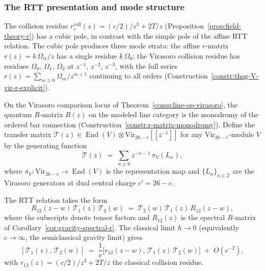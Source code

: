 \subsubsection{The RTT presentation and mode structure}
\label{subsubsec:virasoro-rtt}

The collision residue $r^{\mathrm{coll}}_c(z) = (c/2)/z^3 + 2T/z$
(Proposition~\ref{prop:field-theory-r}) has a cubic pole, in
contrast with the simple pole of the affine RTT relation. The cubic
pole produces three mode strata: the affine $r$-matrix
$r(z) = k\,\Omega_{\mathrm{tr}}/z$ has a single residue $k\,\Omega_0$; the
Virasoro collision residue has residues $\Omega_0$, $\Omega_1$,
$\Omega_2$ at $z^{-1}$, $z^{-2}$, $z^{-3}$, with the full series
$r(z) = \sum_{m \ge 0} \Omega_m/z^{m+1}$ continuing to all orders
(Construction~\ref{constr:thqg-V-vir-r-explicit}).

\begin{construction}
\label{constr:virasoro-rtt-relation}
On the Virasoro comparison locus of
Theorem~\ref{comp:line-op-virasoro}, the quantum $R$-matrix
$R(z)$ on the modeled line category is the
monodromy of the ordered bar connection
(Construction~\ref{constr:r-matrix-monodromy}).
Define the transfer matrix
$\mathcal{T}(z) \in
\operatorname{End}(V) \otimes
\mathrm{Vir}_{26-c}[\![z^{-1}]\!]$
for any $\mathrm{Vir}_{26-c}$-module $V$ by the generating function
\begin{equation}\label{eq:virasoro-transfer}
\mathcal{T}(z)
\;=\;
\sum_{n \ge 0}
z^{-n-1}\,
\pi_V(L_n),
\end{equation}
where $\pi_V \colon \mathrm{Vir}_{26-c} \to \operatorname{End}(V)$
is the representation map and $\{L_n\}_{n \in \mathbb{Z}}$ are the
Virasoro generators at dual central charge $c' = 26 - c$.

The RTT relation takes the form
\begin{equation}\label{eq:virasoro-rtt}
\boxed{
R_{12}(z{-}w)\,
\mathcal{T}_1(z)\,
\mathcal{T}_2(w)
\;=\;
\mathcal{T}_2(w)\,
\mathcal{T}_1(z)\,
R_{12}(z{-}w),
}
\end{equation}
where the subscripts denote tensor factors and
$R_{12}(z)$ is the spectral $R$-matrix of
Corollary~\textup{\ref{cor:gravity-spectral-r}}.
The classical limit $\hbar \to 0$ (equivalently
$c \to \infty$, the semiclassical gravity limit) gives
\begin{equation}\label{eq:virasoro-rtt-classical}
[\mathcal{T}_1(z),\, \mathcal{T}_2(w)]
\;=\;
\frac{1}{c}\bigl[r_{12}(z{-}w),\,
\mathcal{T}_1(z)\,\mathcal{T}_2(w)\bigr]
\;+\; O(c^{-2}),
\end{equation}
with $r_{12}(z) = (c/2)/z^3 + 2T/z$ the classical
collision residue.
\end{construction}

